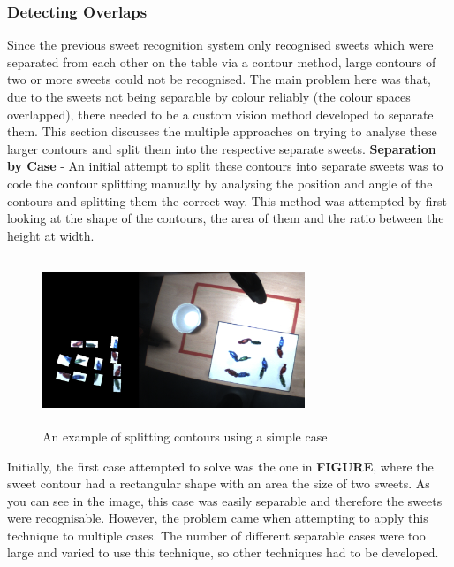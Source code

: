 \subsubsection{Detecting Overlaps}
Since the previous sweet recognition system only recognised sweets which were separated from each other on the table via a contour method, large contours of two or more sweets could not be recognised. The main problem here was that, due to the sweets not being separable by colour reliably (the colour spaces overlapped), there needed to be a custom vision method developed to separate them. This section discusses the multiple approaches on trying to analyse these larger contours and split them into the respective separate sweets.
\newline
\newline
\textbf{Separation by Case} - 
An initial attempt to split these contours into separate sweets was to code the contour splitting manually by analysing the position and angle of the contours and splitting them the correct way. This method was attempted by first looking at the shape of the contours, the area of them and the ratio between the height at width. 
\captionsetup[figure]{justification=centering}
\begin{figure}[H]
        \centering 
        \includegraphics[width=0.7\textwidth, height=5cm]{halvingcollisions.png}
        \caption{An example of splitting contours using a simple case}
        \label{fig:morphAnalysis}
\end{figure}
Initially, the first case attempted to solve was the one in \textbf{FIGURE}, where the sweet contour had a rectangular shape with an area the size of two sweets. As you can see in the image, this case was easily separable and therefore the sweets were recognisable. However, the problem came when attempting to apply this technique to multiple cases. The number of different separable cases were too large and varied to use this technique, so other techniques had to be developed.
\newline\newline
